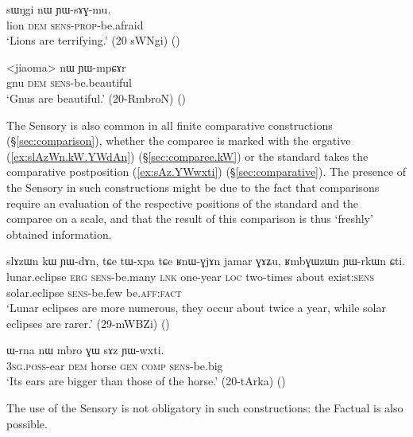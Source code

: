 \begin{exe}
	\ex \label{ex:YWsAGmu}
	\gll  sɯŋgi nɯ ɲɯ-sɤɣ-mu. \\
	lion \textsc{dem} \textsc{sens}-\textsc{prop}-be.afraid \\
	\glt `Lions are terrifying.' (20 sWNgi) ()
\end{exe}
 
\begin{exe}
\ex \label{ex:YWmpCAr}
\gll <jiaoma> nɯ ɲɯ-mpɕɤr \\
gnu \textsc{dem} \textsc{sens}-be.beautiful \\
\glt `Gnus are beautiful.' (20-RmbroN) ()
\end{exe}
 
The Sensory is also common in all finite comparative constructions (§\ref{sec:comparison}), whether the comparee is marked with the ergative (\ref{ex:slAzWn.kW.YWdAn}) (§\ref{sec:comparee.kW}) or the standard takes the comparative postposition (\ref{ex:sAz.YWwxti}) (§\ref{sec:comparative}). The presence of the Sensory in such constructions might be due to the fact that comparisons require an evaluation of the respective positions of the standard and the comparee on a scale, and that the result of this comparison is thus `freshly' obtained information.

\begin{exe}
\ex \label{ex:slAzWn.kW.YWdAn}
\gll slɤzɯn kɯ ɲɯ-dɤn, tɕe tɯ-xpa tɕe ʁnɯ-ɣjɤn jamar ɣɤʑu, ʁmbɣɯzɯn ɲɯ-rkɯn ɕti. \\
lunar.eclipse \textsc{erg} \textsc{sens}-be.many \textsc{lnk} one-year \textsc{loc} two-times about exist:\textsc{sens} solar.eclipse \textsc{sens}-be.few be.\textsc{aff}:\textsc{fact} \\
\glt `Lunar eclipses are more numerous, they occur about twice a year, while solar eclipses are rarer.' (29-mWBZi)
()
\end{exe}

\begin{exe}
\ex \label{ex:sAz.YWwxti}
\gll ɯ-rna nɯ mbro ɣɯ sɤz ɲɯ-wxti. \\
\textsc{3sg}.\textsc{poss}-ear \textsc{dem} horse \textsc{gen} \textsc{comp} \textsc{sens}-be.big \\
\glt `Its ears are bigger than those of the horse.'  (20-tArka)
()
\end{exe}

The use of the Sensory is not obligatory in such constructions: the Factual is also possible. 

